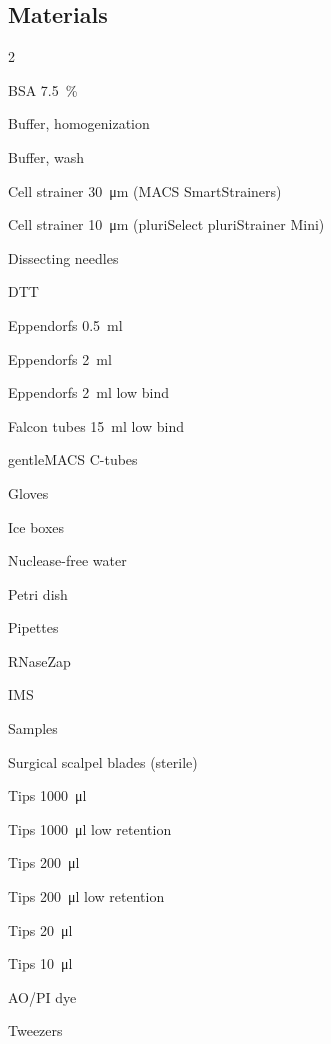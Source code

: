 \documentclass[10pt]{report}
\begin{document}
\subsection*{Materials}
\begin{multicols}{2}
\begin{todolist}
	\item BSA \qty{7.5}{\percent}
	\item Buffer, homogenization
	\item Buffer, wash
	\item Cell strainer \qty{30}{\um} (MACS\textregistered{} SmartStrainers)
	\item Cell strainer \qty{10}{\um} (pluriSelect pluriStrainer Mini)
	\item Dissecting needles
	\item DTT
	\item Eppendorfs \qty{0.5}{\ml}
	\item Eppendorfs \qty{2}{\ml}
	\item Eppendorfs \qty{2}{\ml} low bind
	\item Falcon tubes \qty{15}{\ml} low bind
	\item gentleMACS\textregistered{} C-tubes
	\item Gloves
	\item Ice boxes
	\item Nuclease-free water
	\item Petri dish
	\item Pipettes
	\item RNaseZap\texttrademark{}
	\item IMS
	\item Samples
	\item Surgical scalpel blades (sterile)
	\item Tips \qty[scientific-notation = false, group-digits = false]{1000}{\ul}
	\item Tips \qty[scientific-notation = false, group-digits = false]{1000}{\ul} low retention
	\item Tips \qty{200}{\ul} 
	\item Tips \qty{200}{\ul} low retention
	\item Tips \qty{20}{\ul}
	\item Tips \qty{10}{\ul}
	\item AO/PI dye
	\item Tweezers
\end{todolist}
\end{multicols}

\clearpage
\end{document}
